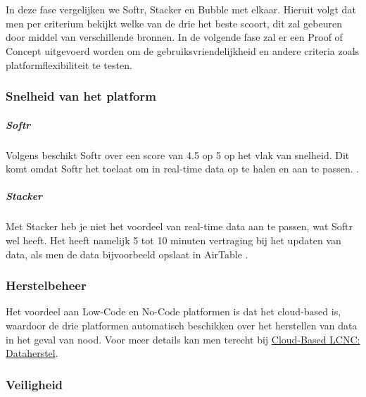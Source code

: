 \chapter{}%
\label{ch:vergelijkende-analyse}
In deze fase vergelijken we Softr, Stacker en Bubble met elkaar.
Hieruit volgt dat men per criterium bekijkt welke van de drie het beste scoort, dit zal gebeuren door middel van verschillende bronnen.
In de volgende fase zal er een Proof of Concept uitgevoerd worden om de gebruiksvriendelijkheid en andere criteria zoals platformflexibiliteit te testen.

\subsection{Snelheid van het platform}%
\label{subsec:snelheid-van-het-platform}
\paragraph{Softr}
Volgens \textcite{Code2023} 
beschikt Softr over een score van 4.5 op 5 op het vlak van snelheid. 
Dit komt omdat Softr het toelaat om in real-time data op te halen en aan te passen. \autocite{Youssef2023}.
\paragraph{Stacker}
Met Stacker heb je niet het voordeel van real-time data aan te passen, wat Softr wel heeft.
 Het heeft namelijk 5 tot 10 minuten vertraging bij het updaten van data, als men de data bijvoorbeeld opslaat in AirTable \autocite{Youssef2023}.

\subsection{Herstelbeheer}%
\label{subsec:herstelbeheer}
Het voordeel aan Low-Code en No-Code platformen is dat het cloud-based is, waardoor de drie platformen automatisch beschikken over het herstellen van data in het geval van nood. 
Voor meer details kan men terecht bij \hyperref[subsec:cloud-based-lcnc]{Cloud-Based LCNC: Dataherstel}.
\subsection{Veiligheid}%
\label{subsec:veiligheid}
